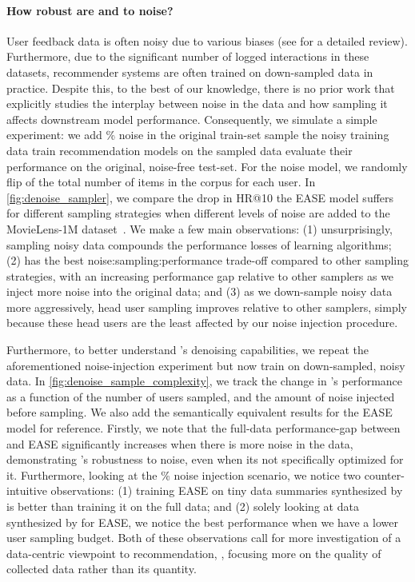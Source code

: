 \documentclass{article}
\begin{document}
\paragraph{How robust are \sampler and \model to noise?}


User feedback data is often 
noisy due to various biases (see \cite{bias_recsys} for a detailed review). Furthermore, due to the significant  number of logged interactions in these datasets, recommender systems are often trained on down-sampled data in practice.
Despite this, to the best of our knowledge, there is no prior work that explicitly studies the interplay between noise in the data and how sampling it affects downstream model performance.
Consequently, we simulate a simple experiment: we add \% noise in the original train-set  sample the noisy training data  train recommendation models on the sampled data  evaluate their performance on the original, noise-free test-set. For the noise model, we randomly flip  of the total number of items in the corpus for each user. In \cref{fig:denoise_sampler}, we compare the drop in HR@10 the EASE model suffers for different sampling strategies when different levels of noise are added to the MovieLens-1M dataset~\cite{movielens}. We make a few 
main
observations: (1) unsurprisingly, sampling noisy data compounds the performance losses of learning algorithms; (2) \sampler has the best noise:sampling:performance trade-off compared to other sampling strategies, with an increasing performance gap relative to other samplers as we inject more noise into the original data; and (3) as we down-sample noisy data more aggressively, head user sampling improves relative to other samplers, simply because these head users are the least affected by our noise injection procedure. 

Furthermore, to better understand \model's denoising capabilities, we repeat the aforementioned noise-injection experiment but now train \model on down-sampled, noisy data. In \cref{fig:denoise_sample_complexity}, we track the change in \model's performance as a function of the number of users sampled, and the amount of noise injected before sampling. We also add the semantically equivalent results for the EASE model for reference. Firstly, we note that the full-data performance-gap between \model and EASE significantly increases when there is more noise in the data, demonstrating \model's robustness to noise, even when its not specifically optimized for it. Furthermore, looking at the \% noise injection scenario, we notice two counter-intuitive observations: (1) training EASE on 
tiny data summaries synthesized by \sampler is better than training it on the full data; and (2) solely looking at data synthesized by \sampler for EASE, we notice the best performance when we have a lower user sampling budget. Both of these observations call for more investigation of a data-centric viewpoint to recommendation, \ie, focusing more on the quality of collected data rather than its quantity.
\end{document}
